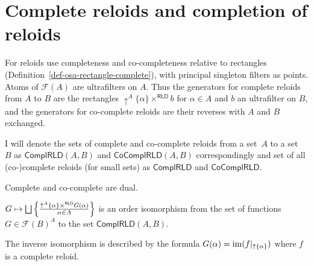 \section{Complete reloids and completion of reloids}
For reloids use completeness and co-completeness relative to
rectangles (Definition~\ref{def-osa-rectangle-complete}), with
principal singleton filters as points. Atoms of $\mathscr F(A)$
are ultrafilters on $A$. Thus the generators for complete reloids
from $A$ to $B$ are the rectangles
$\uparrow^A\{\alpha\}\times^{\mathsf{RLD}}b$ for $\alpha\in A$
and $b$ an ultrafilter on $B$, and the generators for co-complete
reloids are their reverses with $A$ and $B$ exchanged.

I will denote the sets of complete and co-complete reloids from a set~$A$ to a set~$B$ as
$\mathsf{ComplRLD}(A,B)$ and $\mathsf{CoComplRLD}(A,B)$ correspondingly and
set of all (co-)complete reloids (for small sets)
as $\mathsf{ComplRLD}$ and $\mathsf{CoComplRLD}$.
\begin{obvious}
Complete and co-complete are dual.\end{obvious}
\begin{thm}
\label{complrld-rep}$G\mapsto\bigsqcup\setcond{\uparrow^{A}\{\alpha\}\times^{\mathsf{RLD}}G(\alpha)}{\alpha\in A}$
is an order isomorphism from the set of functions $G\in\mathscr{F}(B)^{A}$
to the set $\mathsf{ComplRLD}(A,B)$.

The inverse isomorphism is described by the formula $G(\alpha)=\operatorname{im}(f|_{\uparrow \{\alpha\}})$
where $f$ is a complete reloid.\end{thm}
